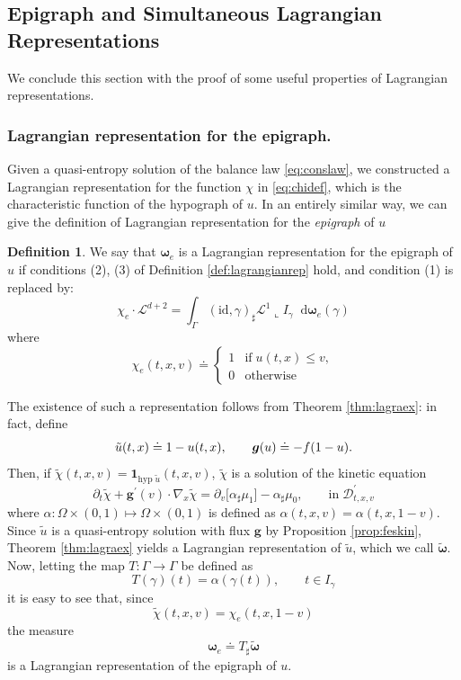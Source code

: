 \documentclass[11pt, twoside, reqno]{amsart}
\theoremstyle{definition}
\newtheorem{defi}[thm]{Definition}
\theoremstyle{remark}
\numberwithin{equation}{section}
\newcommand*\dif{\mathop{}\!\mathrm{d}}
\newcommand{\mr}[1]{\mathrm{#1}}
\newcommand{\bs}[1]{\boldsymbol{#1}}
\newcommand{\msc}[1]{\mathscr{#1}}
\newcommand{\wt}[1]{\widetilde{#1}}
\begin{document}
\subsection{Epigraph and Simultaneous Lagrangian Representations}
We conclude this section with the proof of some useful properties of Lagrangian representations.

\subsubsection{Lagrangian representation for the epigraph.} Given a quasi-entropy solution of the balance law \eqref{eq:conslaw}, we constructed a Lagrangian representation for the function $\chi$ in \eqref{eq:chidef}, which is the characteristic function of the hypograph of $u$. In an entirely similar way, we can give the definition of Lagrangian representation for the \textit{epigraph} of $u$ 

\begin{defi}\label{defi:lagraepi}
We say that $\bs \omega_e$ is a Lagrangian representation for the epigraph of $u$ if conditions (2), (3) of Definition \ref{def:lagrangianrep} hold, and condition (1) is replaced by:
\begin{equation}\label{eq:deflagromegae}
        \chi_e \cdot \mathscr L^{d+2} = \int_{\Gamma} (\mathrm{id}, \gamma)_{\sharp} \mathscr L^1 \llcorner I_{\gamma} \dif \bs \omega_e(\gamma)
    \end{equation}
where 
\begin{equation}
    \chi_e(t,x,v) \doteq \begin{cases}
        1 & \text{if} \; u(t, x) \leq v , \\
        0 & \text{otherwise}
    \end{cases}
\end{equation}
\end{defi}
The existence of such a representation follows from Theorem \ref{thm:lagraex}: in fact, define
$$
\Tilde{u}(t, x)\doteq 1-u(t, x), \qquad \bs g(u) \doteq -f(1-u).
$$
Then, if $\wt \chi(t, x, v) = \mathbf 1_{\mr{hyp} \; \wt u}(t, x, v)$, $\wt \chi$ is a solution of the kinetic equation 
$$
\partial_t \wt \chi + \bs g^{\prime}(v) \cdot \nabla_x \wt \chi = \partial_v \big[ \alpha_{\sharp} \mu_1\big] - \alpha_{\sharp}\mu_0, \qquad \text{in} \; \msc D^{\prime}_{t, x, v}
$$
where $\alpha: \Omega \times (0, 1) \mapsto \Omega \times (0, 1)$ is defined as $\alpha(t, x, v) = \alpha(t, x, 1-v)$.
 Since $\wt u$ is a quasi-entropy solution with flux $\bs g$ by Proposition \ref{prop:feskin}, Theorem \ref{thm:lagraex} yields a Lagrangian representation of $\wt u$, which we call $\wt{\bs \omega}$. Now, letting the map $T : \Gamma \to \Gamma$ be defined as
$$
T(\gamma)(t) =\alpha(\gamma(t)), \qquad t \in I_{\gamma}
$$
it is easy to see that, since 
$$
\wt \chi(t,x,v) =  \chi_e(t,x,1-v)
$$
the measure $$\bs \omega_e \doteq T_{\sharp} \wt{\bs \omega}$$ is a Lagrangian representation of the epigraph of $u$. 
\end{document}
